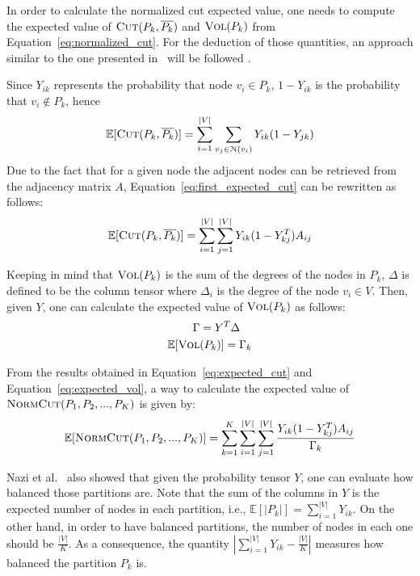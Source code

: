 In order to calculate the normalized cut expected value, one needs to compute the expected value of $\textsc{Cut}(P_k, \overline{P_k})$ and $\textsc{Vol}(P_k)$ from Equation~\ref{eq:normalized_cut}. For the deduction of those quantities, an approach similar to the one presented in~\citep{gap2} will be followed .

Since $Y_{ik}$ represents the probability that node $v_i\in P_k$, $1 - Y_{ik}$ is the probability that $v_i\notin P_k$, hence 
\begin{equation}
    \label{eq:first_expected_cut}
    \mathbb{E}[\textsc{Cut}(P_k, \overline{P_k})] = \sum_{i=1}^{|V|} \sum_{v_j\in\EuScript{N}(v_i)} Y_{ik}(1-Y_{jk})
\end{equation}
Due to the fact that for a given node the adjacent nodes can be retrieved from the adjacency matrix $A$, Equation~\ref{eq:first_expected_cut} can be rewritten as follows:
\begin{equation}
    \label{eq:expected_cut}
    \mathbb{E}[\textsc{Cut}(P_k, \overline{P_k})] = \sum_{i=1}^{|V|}\sum_{j=1}^{|V|}Y_{ik}(1-Y_{kj}^T)A_{ij} 
\end{equation}

Keeping in mind that $\textsc{Vol}(P_k)$ is the sum of the degrees of the nodes in $P_k$, $\Delta$ is defined to be the column tensor where $\Delta_i$ is the degree of the node $v_i\in V$. Then, given $Y$, one can calculate the expected value of $\textsc{Vol}(P_k)$ as follows:
\begin{equation}
    \label{eq:expected_vol}
    \begin{split}
        \Gamma &= Y^T\Delta \\
        \mathbb{E}[\textsc{Vol}&(P_k)] = \Gamma_k
    \end{split}
\end{equation}

From the results obtained in Equation~\ref{eq:expected_cut} and Equation~\ref{eq:expected_vol}, a way to calculate the expected value of $\textsc{NormCut}(P_1, P_2, ..., P_K)$ is given by:
\begin{equation}
    \label{eq:expected_norm_cut}
    \mathbb{E}[\textsc{NormCut}(P_1, P_2, ..., P_K)] = \sum_{k=1}^K\sum_{i=1}^{|V|}\sum_{j=1}^{|V|}\frac{Y_{ik}(1-Y_{kj}^T)A_{ij}}{\Gamma_k}
\end{equation}

Nazi et al.~\cite{gap} also showed that given the probability tensor $Y$, one can evaluate how balanced those partitions are.
Note that the sum of the columns in $Y$ is the expected number of nodes in each partition, i.e., $\mathbb{E}[|P_k|]=\sum_{i=1}^{|V|}Y_{ik}$. On the other hand, in order to have balanced partitions, the number of nodes in each one should be $\frac{|V|}{K}$. As a consequence, the quantity $\left|\sum_{i=1}^{|V|}Y_{ik} - \frac{|V|}{K}\right|$ measures how balanced the partition $P_k$ is.


